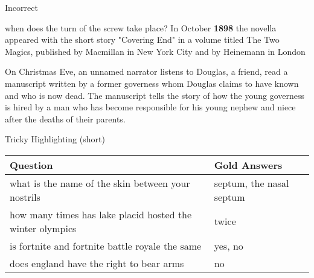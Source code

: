 \documentclass[xcolor=table]{beamer}
\begin{document}
\begin{frame}{Incorrect}

  \begin{block}{when does the turn of the screw take place?}
    In October {\bf 1898} the novella appeared with the short story
    "Covering End" in a volume titled The Two Magics, published by
    Macmillan in New York City and by Heinemann in London
  \end{block}

  \pause On \alert<2>{Christmas Eve}, an unnamed narrator listens to
  Douglas, a friend, read a manuscript written by a former
  \alert<3>{governess whom Douglas claims to have known and who is now
    dead}. The manuscript tells the story of how the young governess
  is hired by a man who has become responsible for his young nephew
  and niece after the deaths of their parents.

\end{frame}

\begin{frame}{Tricky Highlighting (short)}
 
  \begin{tabular}{p{7cm}p{3cm}}
    \toprule
    Question & Gold Answers \\
    \hline
    what is the name of the skin between your nostrils & septum, 
    the nasal septum \\
    how many times has lake placid hosted the winter olympics & twice \\
    is fortnite and fortnite battle royale the same & yes, no \\
    does england have the right to bear arms & no \\
    \bottomrule
  \end{tabular}

\end{frame}
\end{document}
